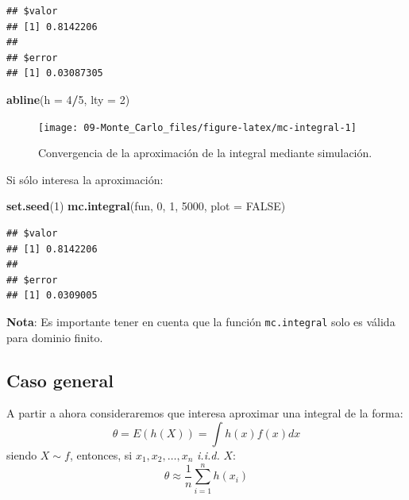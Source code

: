 \documentclass[
]{book}
\newenvironment{Shaded}{\begin{snugshade}}{\end{snugshade}}
\newcommand{\DataTypeTok}[1]{\textcolor[rgb]{0.13,0.29,0.53}{#1}}
\newcommand{\DecValTok}[1]{\textcolor[rgb]{0.00,0.00,0.81}{#1}}
\newcommand{\KeywordTok}[1]{\textcolor[rgb]{0.13,0.29,0.53}{\textbf{#1}}}
\newcommand{\NormalTok}[1]{#1}
\newcommand{\OperatorTok}[1]{\textcolor[rgb]{0.81,0.36,0.00}{\textbf{#1}}}
\newcommand{\OtherTok}[1]{\textcolor[rgb]{0.56,0.35,0.01}{#1}}
\theoremstyle{break}
\theoremstyle{definition}
\theoremstyle{definition}
\theoremstyle{definition}
\theoremstyle{remark}
\begin{document}
\begin{verbatim}
## $valor
## [1] 0.8142206
## 
## $error
## [1] 0.03087305
\end{verbatim}

\begin{Shaded}
\begin{Highlighting}[]
\KeywordTok{abline}\NormalTok{(}\DataTypeTok{h =} \DecValTok{4}\OperatorTok{/}\DecValTok{5}\NormalTok{, }\DataTypeTok{lty =} \DecValTok{2}\NormalTok{)}
\end{Highlighting}
\end{Shaded}

\begin{figure}[!htb]

{\centering \texttt{[image: 09-Monte\_Carlo\_files/figure-latex/mc-integral-1]} 

}

\caption{Convergencia de la aproximación de la integral mediante simulación.}\label{fig:mc-integral}
\end{figure}

Si sólo interesa la aproximación:

\begin{Shaded}
\begin{Highlighting}[]
\KeywordTok{set.seed}\NormalTok{(}\DecValTok{1}\NormalTok{)}
\KeywordTok{mc.integral}\NormalTok{(fun, }\DecValTok{0}\NormalTok{, }\DecValTok{1}\NormalTok{, }\DecValTok{5000}\NormalTok{, }\DataTypeTok{plot =} \OtherTok{FALSE}\NormalTok{)}
\end{Highlighting}
\end{Shaded}

\begin{verbatim}
## $valor
## [1] 0.8142206
## 
## $error
## [1] 0.0309005
\end{verbatim}

\textbf{Nota}: Es importante tener en cuenta que la función \texttt{mc.integral} solo es válida para dominio finito.

\hypertarget{caso-general}{%
\subsection{Caso general}\label{caso-general}}

A partir a ahora consideraremos que interesa aproximar una integral de la forma:
\[\theta = E\left( h\left( X\right) \right) = \int h\left( x\right) f(x)dx\]siendo
\(X\sim f\), entonces, si \(x_1,x_2,\ldots ,x_n\) \emph{i.i.d.}
\(X\):
\[\theta \approx \frac{1}{n}\sum\limits_{i=1}^nh\left( x_i\right)\]
\end{document}
